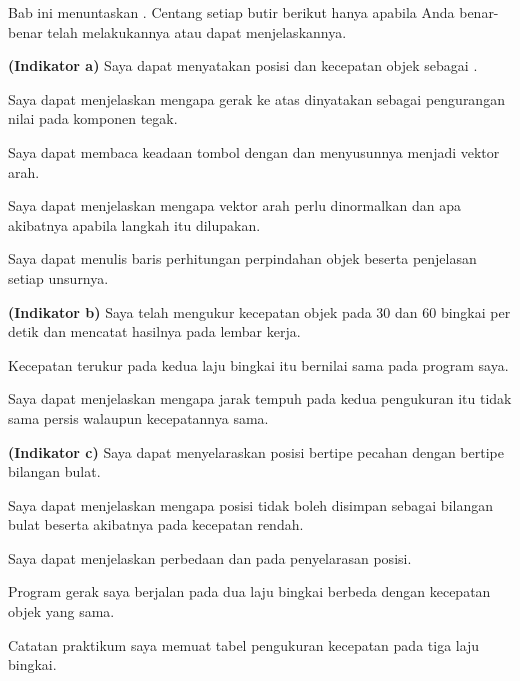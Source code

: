 
Bab ini menuntaskan . Centang setiap butir berikut hanya apabila
Anda benar-benar telah melakukannya atau dapat menjelaskannya.

\begin{checklistbox}
\begin{checklist}
  \item {\bfseries (Indikator a)} Saya dapat menyatakan posisi dan kecepatan
        objek sebagai .
  \item Saya dapat menjelaskan mengapa gerak ke atas dinyatakan sebagai
        pengurangan nilai pada komponen tegak.
  \item Saya dapat membaca keadaan tombol dengan
         dan menyusunnya menjadi vektor arah.
  \item Saya dapat menjelaskan mengapa vektor arah perlu dinormalkan dan apa
        akibatnya apabila langkah itu dilupakan.
  \item Saya dapat menulis baris perhitungan perpindahan objek beserta
        penjelasan setiap unsurnya.
  \item {\bfseries (Indikator b)} Saya telah mengukur kecepatan objek pada 30
        dan 60 bingkai per detik dan mencatat hasilnya pada lembar kerja.
  \item Kecepatan terukur pada kedua laju bingkai itu bernilai sama pada
        program saya.
  \item Saya dapat menjelaskan mengapa jarak tempuh pada kedua pengukuran itu
        tidak sama persis walaupun kecepatannya sama.
  \item {\bfseries (Indikator c)} Saya dapat menyelaraskan posisi bertipe
        pecahan dengan  bertipe bilangan bulat.
  \item Saya dapat menjelaskan mengapa posisi tidak boleh disimpan sebagai
        bilangan bulat beserta akibatnya pada kecepatan rendah.
  \item Saya dapat menjelaskan perbedaan  dan  pada
        penyelarasan posisi.
  \item Program gerak saya berjalan pada dua laju bingkai berbeda dengan
        kecepatan objek yang sama.
  \item Catatan praktikum saya memuat tabel pengukuran kecepatan pada tiga
        laju bingkai.
\end{checklist}
\end{checklistbox}
